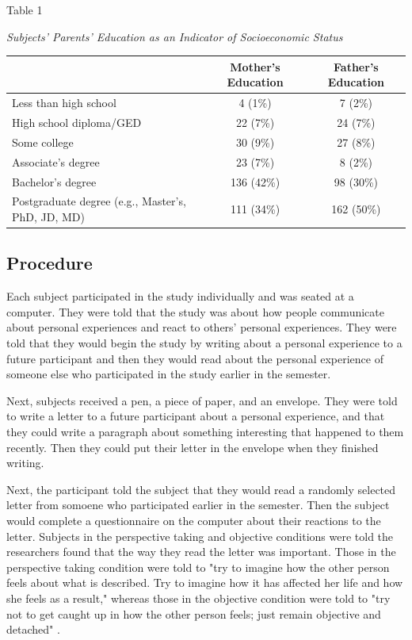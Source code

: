 \documentclass[man,a4paper,noextraspace,apacite]{apa6}\usepackage[]{graphicx}\usepackage[]{color}
\begin{document}
\begin{table}
  Table 1
  
  \textit{Subjects' Parents' Education as an Indicator of Socioeconomic Status}

  \begin{tabular}{l c c}
     \hline
     & Mother's Education & Father's Education \\
     \hline
     Less than high school & 
        4 (1\%) & 
        7 (2\%) \\
     High school diploma/GED & 
        22 (7\%) & 
        24 (7\%) \\
     Some college & 
        30 (9\%) & 
        27 (8\%) \\
     Associate's degree & 
        23 (7\%) & 
        8 (2\%) \\
     Bachelor's degree & 
        136 (42\%) & 
        98 (30\%) \\
     Postgraduate degree (e.g., Master's, PhD, JD, MD) & 
        111 (34\%) & 
        162 (50\%) \\
     \hline
  \end{tabular}

\end{table}

\subsection{Procedure}
Each subject participated in the study individually and was seated at a computer. They were told that the study was about how people communicate about personal experiences and react to others' personal experiences. They were told that they would begin the study by writing about a personal experience to a future participant and then they would read about the personal experience of someone else who participated in the study earlier in the semester.

Next, subjects received a pen, a piece of paper, and an envelope. They were told to write a letter to a future participant about a personal experience, and that they could write a paragraph about something interesting that happened to them recently. Then they could put their letter in the envelope when they finished writing. 

Next, the participant told the subject that they would read a randomly selected letter from somoene who participated earlier in the semester. Then the subject would complete a questionnaire on the computer about their reactions to the letter. Subjects in the perspective taking and objective conditions were told the researchers found that the way they read the letter was important. Those in the perspective taking condition were told to "try to imagine how the other person feels about what is described. Try to imagine how it has affected her life and how she feels as a result," whereas those in the objective condition were told to "try not to get caught up in how the other person feels; just remain objective and detached" \cite{Batson2002, Batson2007}.
\end{document}

